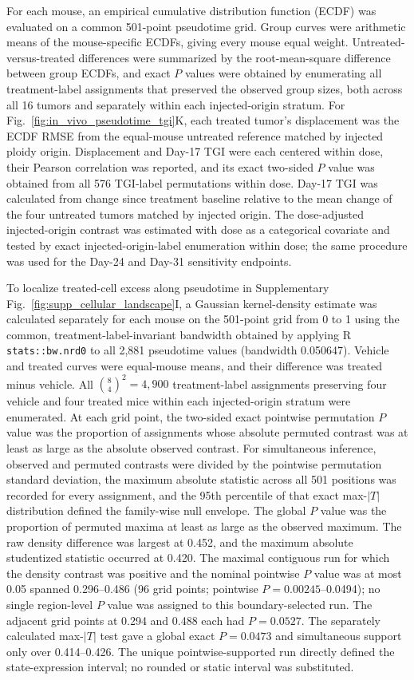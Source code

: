 \documentclass[11pt,notitlepage]{article}
\begin{document}
For each mouse, an empirical cumulative distribution function (ECDF) was evaluated on a common 501-point pseudotime grid. Group curves were arithmetic means of the mouse-specific ECDFs, giving every mouse equal weight. Untreated-versus-treated differences were summarized by the root-mean-square difference between group ECDFs, and exact $P$ values were obtained by enumerating all treatment-label assignments that preserved the observed group sizes, both across all 16 tumors and separately within each injected-origin stratum. For Fig.~\ref{fig:in_vivo_pseudotime_tgi}K, each treated tumor's displacement was the ECDF RMSE from the equal-mouse untreated reference matched by injected ploidy origin. Displacement and Day-17 TGI were each centered within dose, their Pearson correlation was reported, and its exact two-sided $P$ value was obtained from all 576 TGI-label permutations within dose. Day-17 TGI was calculated from change since treatment baseline relative to the mean change of the four untreated tumors matched by injected origin. The dose-adjusted injected-origin contrast was estimated with dose as a categorical covariate and tested by exact injected-origin-label enumeration within dose; the same procedure was used for the Day-24 and Day-31 sensitivity endpoints.

To localize treated-cell excess along pseudotime in Supplementary Fig.~\ref{fig:supp_cellular_landscape}I, a Gaussian kernel-density estimate was calculated separately for each mouse on the 501-point grid from 0 to 1 using the common, treatment-label-invariant bandwidth obtained by applying R \texttt{stats::bw.nrd0} to all 2,881 pseudotime values (bandwidth 0.050647). Vehicle and treated curves were equal-mouse means, and their difference was treated minus vehicle. All \({8\choose4}^{2}=4{,}900\) treatment-label assignments preserving four vehicle and four treated mice within each injected-origin stratum were enumerated. At each grid point, the two-sided exact pointwise permutation $P$ value was the proportion of assignments whose absolute permuted contrast was at least as large as the absolute observed contrast. For simultaneous inference, observed and permuted contrasts were divided by the pointwise permutation standard deviation, the maximum absolute statistic across all 501 positions was recorded for every assignment, and the 95th percentile of that exact max-\(|T|\) distribution defined the family-wise null envelope. The global $P$ value was the proportion of permuted maxima at least as large as the observed maximum. The raw density difference was largest at 0.452, and the maximum absolute studentized statistic occurred at 0.420. The maximal contiguous run for which the density contrast was positive and the nominal pointwise $P$ value was at most 0.05 spanned 0.296--0.486 (96 grid points; pointwise $P=0.00245$--0.0494); no single region-level $P$ value was assigned to this boundary-selected run. The adjacent grid points at 0.294 and 0.488 each had $P=0.0527$. The separately calculated max-\(|T|\) test gave a global exact $P=0.0473$ and simultaneous support only over 0.414--0.426. The unique pointwise-supported run directly defined the state-expression interval; no rounded or static interval was substituted.
\end{document}
